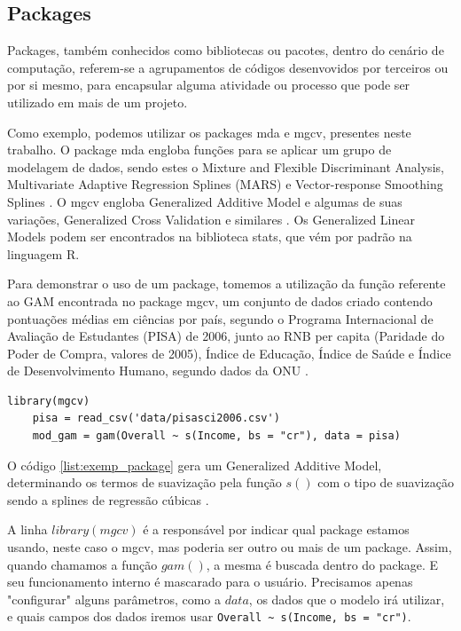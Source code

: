 \documentclass[
    12pt,               %
    openright,          %
    oneside,            %
    a4paper,            %
    english,            %
    brazil              %
    ]{abntex2}
\begin{document}
\subsection{Packages}

Packages, também conhecidos como bibliotecas ou pacotes, dentro do cenário de computação, referem-se a agrupamentos de códigos 
desenvovidos por terceiros ou por si mesmo, para encapsular alguma atividade ou processo que pode ser utilizado em mais de um projeto.

Como exemplo, podemos utilizar os packages mda e mgcv, presentes neste trabalho. O package mda engloba funções para se aplicar
um grupo de modelagem de dados, sendo estes o Mixture and Flexible Discriminant Analysis, Multivariate Adaptive Regression 
Splines (MARS) e Vector-response Smoothing Splines \cite{mda}. O mgcv engloba Generalized Additive Model e algumas de suas variações,
Generalized Cross Validation e similares \cite{mgcv}. Os Generalized Linear Models podem ser encontrados na biblioteca stats, que
vém por padrão na linguagem R.

Para demonstrar o uso de um package, tomemos a utilização da função referente ao GAM encontrada no package mgcv, um conjunto de dados
criado contendo pontuações médias em ciências por país, segundo o Programa Internacional de Avaliação de Estudantes (PISA) de 2006,
junto ao RNB per capita (Paridade do Poder de Compra, valores de 2005), Índice de Educação, Índice de Saúde e 
Índice de Desenvolvimento Humano, segundo dados da ONU \cite{gam_exemplo}.

\lstset{style=r_code}
\begin{lstlisting}[caption={\label{list:exemp_package}Exemplo uso de package}]
    library(mgcv)
    pisa = read_csv('data/pisasci2006.csv')
    mod_gam = gam(Overall ~ s(Income, bs = "cr"), data = pisa)
\end{lstlisting}

O código \ref{list:exemp_package} gera um Generalized Additive Model, determinando os termos de suavização pela função $s()$ com o
tipo de suavização sendo a splines de regressão cúbicas \cite{gam_exemplo}. 

A linha $library(mgcv)$ é a responsável por indicar qual package estamos usando, neste caso o mgcv, mas poderia ser outro ou mais 
de um package. Assim, quando chamamos a função $gam()$, a mesma é buscada dentro do package. E seu funcionamento interno é mascarado 
para o usuário. Precisamos apenas "configurar" alguns parâmetros, como a $data$, os dados que o modelo irá utilizar, e quais campos 
dos dados iremos usar \verb|Overall ~ s(Income, bs = "cr")|.  
\end{document}
